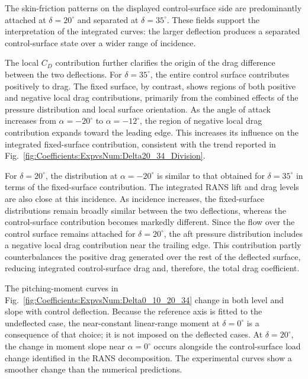 \documentclass[journal ]{new-aiaa}
\begin{document}
The skin-friction patterns on the displayed control-surface side are predominantly attached at $\delta=20^\circ$ and separated at $\delta=35^\circ$.
These fields support the interpretation of the integrated curves: the larger deflection produces a separated control-surface state over a wider range of incidence.

The local $C_D$ contribution further clarifies the origin of the drag difference between the two deflections.
For $\delta=35^\circ$, the entire control surface contributes positively to drag.
The fixed surface, by contrast, shows regions of both positive and negative local drag contributions, primarily from the combined effects of the pressure distribution and local surface orientation.
As the angle of attack increases from $\alpha=-20^\circ$ to $\alpha=-12^\circ$, the region of negative local drag contribution expands toward the leading edge.
This increases its influence on the integrated fixed-surface contribution, consistent with the trend reported in Fig.~\ref{fig:Coefficients:ExpvsNum:Delta20_34_Division}.

For $\delta=20^\circ$, the distribution at $\alpha=-20^\circ$ is similar to that obtained for $\delta=35^\circ$ in terms of the fixed-surface contribution.
The integrated RANS lift and drag levels are also close at this incidence.
As incidence increases, the fixed-surface distributions remain broadly similar between the two deflections, whereas the control-surface contribution becomes markedly different.
Since the flow over the control surface remains attached for $\delta=20^\circ$, the aft pressure distribution includes a negative local drag contribution near the trailing edge.
This contribution partly counterbalances the positive drag generated over the rest of the deflected surface, reducing integrated control-surface drag and, therefore, the total drag coefficient.



The pitching-moment curves in Fig.~\ref{fig:Coefficients:ExpvsNum:Delta0_10_20_34} change in both level and slope with control deflection.
Because the reference axis is fitted to the undeflected case, the near-constant linear-range moment at \(\delta=0^\circ\) is a consequence of that choice; it is not imposed on the deflected cases.
At \(\delta=20^\circ\), the change in moment slope near \(\alpha=0^\circ\) occurs alongside the control-surface load change identified in the RANS decomposition.
The experimental curves show a smoother change than the numerical predictions.
\end{document}
